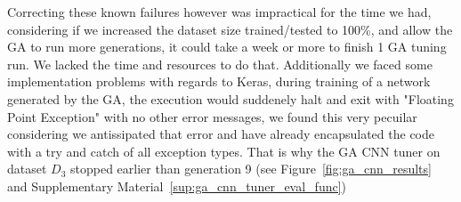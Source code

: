 Correcting these known failures however was impractical for the time we had,  considering if we increased the dataset size trained/tested to 100\%, and allow the GA to run more generations, it could take a week or more to finish 1 GA tuning run. We lacked the time and resources to do that. Additionally we faced some implementation problems with regards to Keras, during training of a network generated by the GA, the execution would suddenely halt and exit with "Floating Point Exception" with no other error messages, we found this very pecuilar considering we antissipated that error and have already encapsulated the code with a try and catch of all exception types. That is why the GA CNN tuner on dataset $D_{3}$ stopped earlier than generation 9 (see Figure~\ref{fig:ga_cnn_results} and Supplementary Material~\ref{sup:ga_cnn_tuner_eval_func})